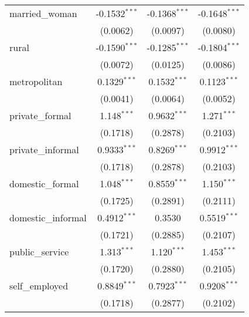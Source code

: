 \begin{tabular}{lccc}
   married\_woman                  & -0.1532$^{***}$              & -0.1368$^{***}$        & -0.1648$^{***}$\\   
                                   & (0.0062)                     & (0.0097)               & (0.0080)\\   
   rural                           & -0.1590$^{***}$              & -0.1285$^{***}$        & -0.1804$^{***}$\\   
                                   & (0.0072)                     & (0.0125)               & (0.0086)\\   
   metropolitan                    & 0.1329$^{***}$               & 0.1532$^{***}$         & 0.1123$^{***}$\\   
                                   & (0.0041)                     & (0.0064)               & (0.0052)\\   
   private\_formal                 & 1.148$^{***}$                & 0.9632$^{***}$         & 1.271$^{***}$\\   
                                   & (0.1718)                     & (0.2878)               & (0.2103)\\   
   private\_informal               & 0.9333$^{***}$               & 0.8269$^{***}$         & 0.9912$^{***}$\\   
                                   & (0.1718)                     & (0.2878)               & (0.2103)\\   
   domestic\_formal                & 1.048$^{***}$                & 0.8559$^{***}$         & 1.150$^{***}$\\   
                                   & (0.1725)                     & (0.2891)               & (0.2111)\\   
   domestic\_informal              & 0.4912$^{***}$               & 0.3530                 & 0.5519$^{***}$\\   
                                   & (0.1721)                     & (0.2885)               & (0.2107)\\   
   public\_service                 & 1.313$^{***}$                & 1.120$^{***}$          & 1.453$^{***}$\\   
                                   & (0.1720)                     & (0.2880)               & (0.2105)\\   
   self\_employed                  & 0.8849$^{***}$               & 0.7923$^{***}$         & 0.9208$^{***}$\\   
                                   & (0.1718)                     & (0.2877)               & (0.2102)\\   

\end{tabular}
